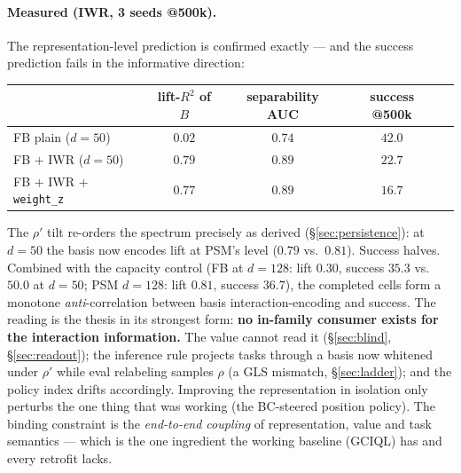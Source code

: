 \documentclass[11pt,a4paper]{article}
\begin{document}
\paragraph{Measured (IWR, 3 seeds @500k).} The representation-level prediction is confirmed
exactly --- and the success prediction fails in the informative direction:
\begin{center}\small
\begin{tabular}{@{}lcccc@{}}
\toprule
 & lift-$R^{2}$ of $B$ & separability AUC & success @500k &\\
\midrule
FB plain ($d{=}50$) & $0.02$ & $0.74$ & $42.0$ &\\
FB $+$ IWR ($d{=}50$) & $\mathbf{0.79}$ & $\mathbf{0.89}$ & $22.7$ &\\
FB $+$ IWR $+$ \texttt{weight\_z} & $0.77$ & $0.89$ & $16.7$ &\\
\bottomrule
\end{tabular}
\end{center}
The $\rho'$ tilt re-orders the spectrum precisely as derived (\S\ref{sec:persistence}): at
$d{=}50$ the basis now encodes lift at PSM's level ($0.79$ vs.\ $0.81$). Success halves.
Combined with the capacity control (FB at $d{=}128$: lift $0.30$, success $35.3$ vs.\ $50.0$ at
$d{=}50$; PSM $d{=}128$: lift $0.81$, success $36.7$), the completed cells form a monotone
\emph{anti}-correlation between basis interaction-encoding and success. The reading is the
thesis in its strongest form: \textbf{no in-family consumer exists for the interaction
information.} The value cannot read it (\S\ref{sec:blind}, \S\ref{sec:readout}); the inference
rule projects tasks through a basis now whitened under $\rho'$ while eval relabeling samples
$\rho$ (a GLS mismatch, \S\ref{sec:ladder}); and the policy index drifts accordingly. Improving
the representation in isolation only perturbs the one thing that was working (the BC-steered
position policy). The binding constraint is the \emph{end-to-end coupling} of representation,
value and task semantics --- which is the one ingredient the working baseline (GCIQL) has and
every retrofit lacks.
\end{document}
